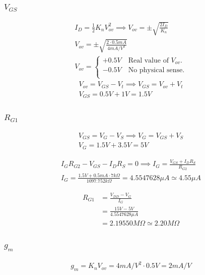 \documentclass[10pt,a4paper]{book}
\begin{document}
\subsubsection{$V_{GS}$}
\begin{align}
I_D = \frac{1}{2}K_nV_{ov}^2 \implies
V_{ov} = \pm \sqrt{\frac{2 I_D}{K_n}}\\
V_{ov} = \pm \sqrt{\frac{2 \cdot 0.5mA}{4 mA/V^2}}\\
V_{ov} =
\left\{\begin{array}{l}
  + 0.5V \quad \text{Real value of } V_{ov} \text{.}\\
  - 0.5V \quad \text{No physical sense.}\\
\end{array}\right.
\end{align}
\begin{align}
V_{ov} = V_{GS} - V_{t} \implies
V_{GS} = V_{ov} + V_{t}\\
V_{GS} = 0.5V + 1V = 1.5V
\end{align}

\subsubsection{$R_{G1}$}
\begin{align}
V_{GS} = V_G - V_S \implies
V_G = V_{GS} + V_S\\
V_G = 1.5V + 3.5V = 5V
\end{align}

\begin{align}
I_G R_{G2} - V_{GS} - I_D R_S = 0 \implies
I_G = \frac{V_{GS}+I_D R_S}{R_{G2}}\\
I_G = \frac{1.5V + 0.5mA \cdot 7k\Omega}{1097.752k\Omega} = 4.5547628\mu A \simeq 4.55 \mu A
\end{align}

\begin{align}
R_{G1} &= \frac{V_{DD} - V_G}{I_G}\\
&= \frac{15V - 5V}{4.5547628 \mu A}\\
&=2.19550 M\Omega \simeq 2.20 M\Omega
\end{align}

\subsubsection{$g_m$}
\begin{align}
g_m = K_n V_{ov} = 4 mA/V^2 \cdot 0.5V = 2 mA/V
\end{align}
\end{document}
